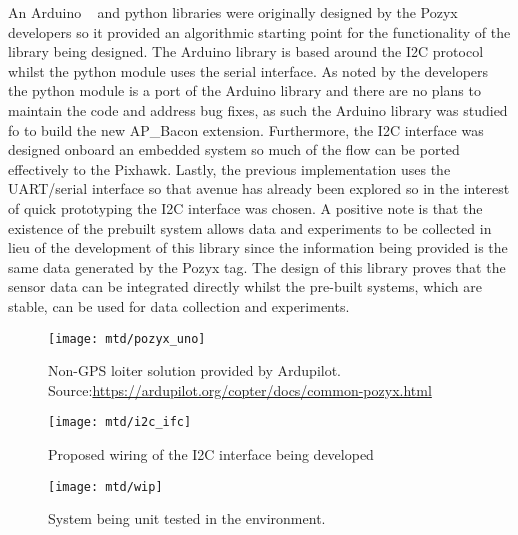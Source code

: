 An Arduino ~\citep{pozarduino} and python libraries were originally designed by the Pozyx developers so it provided an algorithmic starting point for the functionality of the library being designed.
The Arduino library is based around the I2C protocol whilst the python module uses the serial interface.
As noted by the developers the python module is a port of the Arduino library and there are no plans to maintain the code and address bug fixes, as such the Arduino library was studied fo to build the new AP\_Bacon extension.
Furthermore, the I2C interface was designed onboard an embedded system so much of the flow can be ported effectively to the Pixhawk.
Lastly, the previous implementation uses the UART/serial interface so that avenue has already been explored so in the interest of quick prototyping the I2C interface was chosen.
A positive note is that the existence of the prebuilt system allows data and experiments to be collected in lieu of the development of this library since the information being provided is the same data generated by the Pozyx tag.
The design of this library proves that the sensor data can be integrated directly whilst the pre-built systems, which are stable, can be used for data collection and experiments.
%


\begin{figure}[ht!]
    \centering
    \texttt{[image: mtd/pozyx\_uno]}
    \caption{Non-GPS loiter solution provided by Ardupilot.
    Source:\url{https://ardupilot.org/copter/docs/common-pozyx.html}}
\end{figure}

\begin{figure}[ht!]
    \centering
    \texttt{[image: mtd/i2c\_ifc]}
    \caption{Proposed wiring of the I2C interface being developed}
\end{figure}

\begin{figure}[ht!]
    \centering
    \texttt{[image: mtd/wip]}
    \caption{System being unit tested in the environment.}
\end{figure}
\newpage
